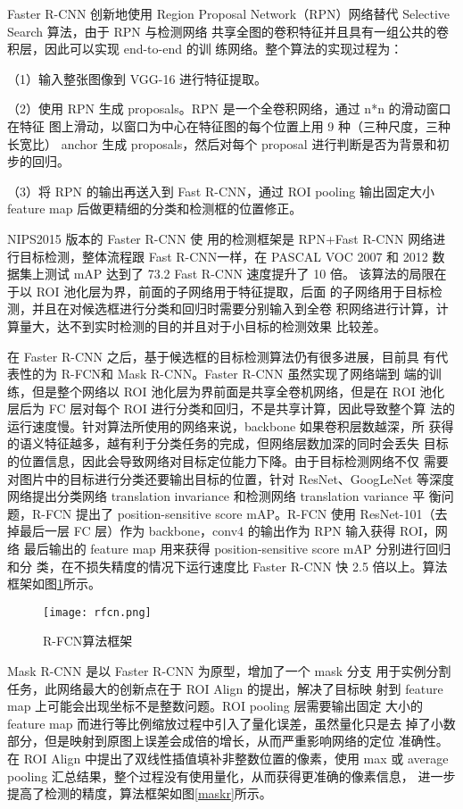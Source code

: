 Faster R-CNN 创新地使用 Region
Proposal Network（RPN）网络替代 Selective Search 算法，由于 RPN 与检测网络
共享全图的卷积特征并且具有一组公共的卷积层，因此可以实现 end-to-end 的训
练网络。整个算法的实现过程为：

（1）输入整张图像到 VGG-16 进行特征提取。

（2）使用 RPN 生成 proposals。RPN 是一个全卷积网络，通过 n*n 的滑动窗口在特征
图上滑动，以窗口为中心在特征图的每个位置上用 9 种（三种尺度，三种长宽比）
anchor 生成 proposals，然后对每个 proposal 进行判断是否为背景和初步的回归。

（3）将 RPN 的输出再送入到 Fast R-CNN，通过 ROI pooling 输出固定大小 feature
map 后做更精细的分类和检测框的位置修正。

NIPS2015 版本的 Faster R-CNN 使
用的检测框架是 RPN+Fast R-CNN 网络进行目标检测，整体流程跟 Fast R-CNN一样，在 PASCAL VOC 2007 和 2012 数据集上测试 mAP 达到了 73.2%
Fast R-CNN 速度提升了 10 倍。
该算法的局限在于以 ROI 池化层为界，前面的子网络用于特征提取，后面
的子网络用于目标检测，并且在对候选框进行分类和回归时需要分别输入到全卷
积网络进行计算，计算量大，达不到实时检测的目的并且对于小目标的检测效果
比较差。

在 Faster R-CNN 之后，基于候选框的目标检测算法仍有很多进展，目前具
有代表性的为 R-FCN\cite{dai2016r}和 Mask R-CNN\cite{he2017mask}。Faster R-CNN 虽然实现了网络端到
端的训练，但是整个网络以 ROI 池化层为界前面是共享全卷机网络，但是在 ROI
池化层后为 FC 层对每个 ROI 进行分类和回归，不是共享计算，因此导致整个算
法的运行速度慢。针对算法所使用的网络来说，backbone 如果卷积层数越深，所
获得的语义特征越多，越有利于分类任务的完成，但网络层数加深的同时会丢失
目标的位置信息，因此会导致网络对目标定位能力下降。由于目标检测网络不仅
需要对图片中的目标进行分类还要输出目标的位置，针对 ResNet、GoogLeNet
等深度网络提出分类网络 translation invariance 和检测网络 translation variance 平
衡问题，R-FCN 提出了 position-sensitive score mAP。R-FCN 使用 ResNet-101（去
掉最后一层 FC 层）作为 backbone，conv4 的输出作为 RPN 输入获得 ROI，网络
最后输出的 feature map 用来获得 position-sensitive score mAP 分别进行回归和分
类，在不损失精度的情况下运行速度比 Faster R-CNN 快 2.5 倍以上。算法框架如图\ref{rfcn}所示。

\begin{figure}[htbp]
    \centering
    \texttt{[image: rfcn.png]}
    \caption{R-FCN算法框架}
    \label{rfcn}
\end{figure}

Mask R-CNN 是以 Faster R-CNN 为原型，增加了一个 mask 分支
用于实例分割任务，此网络最大的创新点在于 ROI Align 的提出，解决了目标映
射到 feature map 上可能会出现坐标不是整数问题。ROI pooling 层需要输出固定
大小的 feature map 而进行等比例缩放过程中引入了量化误差，虽然量化只是去
掉了小数部分，但是映射到原图上误差会成倍的增长，从而严重影响网络的定位
准确性。在 ROI Align 中提出了双线性插值填补非整数位置的像素，使用 max 或
average pooling 汇总结果，整个过程没有使用量化，从而获得更准确的像素信息，
进一步提高了检测的精度，算法框架如图\ref{maskr}所示。


